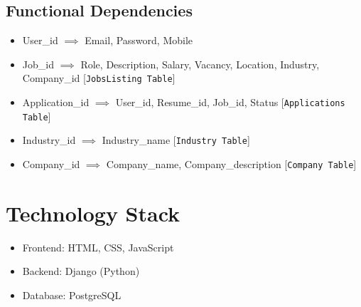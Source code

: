 \documentclass[12pt]{article}
\begin{document}
\begin{itemize}
\subsection*{Functional Dependencies}
\begin{itemize}
    \item User\_id $\implies$ Email, Password, Mobile 
    \item Job\_id $\implies$ Role, Description, Salary, Vacancy, Location, Industry, Company\_id [\texttt{JobsListing Table}]
    \item Application\_id $\implies$ User\_id, Resume\_id, Job\_id, Status [\texttt{Applications Table}]
    \item Industry\_id $\implies$ Industry\_name [\texttt{Industry Table}]
    \item Company\_id $\implies$ Company\_name, Company\_description [\texttt{Company Table}]
\end{itemize}

\section*{Technology Stack}
\begin{itemize}
    \item Frontend: HTML, CSS, JavaScript
    \item Backend: Django (Python)
    \item Database: PostgreSQL
\end{itemize}


\end{itemize}
\end{document}

